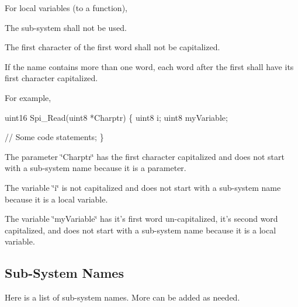 For local variables (to a function),
\begin{DoxyItemize}
\item The sub-\/system shall not be used.
\item The first character of the first word shall not be capitalized.
\item If the name contains more than one word, each word after the first shall have its first character capitalized.
\end{DoxyItemize}

For example,\par
\par



\begin{DoxyCode}
uint16 Spi\_Read(uint8 *Charptr) 
\{
  uint8 i;
  uint8 myVariable;
  
  \textcolor{comment}{// Some code}
  statements;
\}
\end{DoxyCode}
\par



\begin{DoxyItemize}
\item The parameter \char`\"{}\-Charptr\char`\"{} has the first character capitalized and does not start with a sub-\/system name because it is a parameter.
\item The variable \char`\"{}i\char`\"{} is not capitalized and does not start with a sub-\/system name because it is a local variable.
\item The variable \char`\"{}my\-Variable\char`\"{} has it's first word un-\/capitalized, it's second word capitalized, and does not start with a sub-\/system name because it is a local variable.
\end{DoxyItemize}\hypertarget{index_SSN}{}\subsection{Sub-\/\-System Names}\label{index_SSN}
Here is a list of sub-\/system names. More can be added as needed. \par


